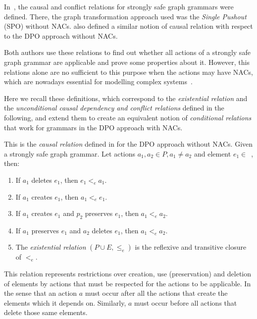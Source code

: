 In~\cite{Ribeiro1996}, the causal and conflict relations for strongly safe graph grammars were defined. There, the graph transformation approach used was the \emph{Single Pushout} (SPO) without NACs. \cite{Corradini1996} also defined a similar notion of causal relation with respect to the DPO approach without NACs.

Both authors use these relations to find out whether all actions of a strongly safe graph grammar are applicable and prove some properties about it. However, this relations alone are no sufficient to this purpose when the actions may have NACs, which are nowadays essential for modelling complex systems~\cite{Corradini2014}.

Here we recall these definitions, which correspond to the \emph{existential relation} and the \emph{unconditional causal dependency and conflict relations} defined in the following, and extend them to create an equivalent notion of \emph{conditional relations} that work for grammars in the DPO approach with NACs.

\begin{definition} This is the \emph{causal relation} defined in \cite{Corradini1996} for the DPO approach without NACs. Given  \doublyTypedGraphGrammarCore{} a strongly safe graph grammar. Let actions $a_1, a_2 \in P, a_1 \ne a_2$ and element \mbox{$e_1 \in $ \coreGraph{}}, then:

  \begin{enumerate}
    \item If $a_1$ deletes $e_1$, then $e_1 <_e a_1$.
    \item If $a_1$ creates $e_1$, then $a_1 <_e e_1$.
    \item If $a_1$ creates $e_1$ and $p_2$ preserves $e_1$, then $a_1 <_e a_2$.
    \item If $a_1$ preserves $e_1$ and $a_2$ deletes $e_1$, then $a_1 <_e a_2$. 
    \item The \emph{existential relation} $(P \cup E, \leq_e)$ is the reflexive and transitive closure of $<_e$.
  \end{enumerate}
\end{definition}

This relation represents restrictions over creation, use (preservation) and deletion of elements by actions that must be respected for the actions to be applicable. In the sense that an action $a$ must occur after all the actions that create the elements which it depends on. Similarly, $a$ must occur before all actions that delete those same elements.

